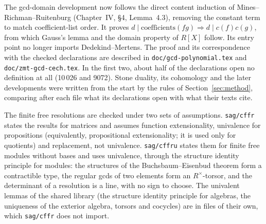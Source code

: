 \documentclass[11pt]{article}
\begin{document}
The gcd-domain development now follows the direct content induction of
Mines--Richman--Ruitenburg (Chapter~IV, \S4, Lemma~4.3), removing the
constant term to match coefficient-list order. It proves
$d\mid\text{coefficients}(fg)\Rightarrow d\mid c(f)c(g)$, from which
Gauss's lemma and the domain property of $R[X]$ follow. Its entry point
no longer imports Dedekind--Mertens. The proof and its correspondence
with the checked declarations are described in
\texttt{doc/gcd-polynomial.tex} and \texttt{doc/zmt-gcd-cech.tex}.
In the first two, about half of the declarations open no definition at
all (10\,026 and 9072). Stone duality, its cohomology and the later
developments were written from the start by the
rules of Section~\ref{sec:method}, comparing after each file what its
declarations open with what their texts cite.

The finite free resolutions are checked under two sets of assumptions.
\texttt{sag/cffr} states the results for matrices and assumes function
extensionality, univalence for propositions (equivalently, propositional
extensionality; it is used only for quotients) and replacement, not
univalence. \texttt{sag/cffru} states them for finite free modules
without bases and uses univalence, through the structure identity
principle for modules: the structures of the Buchsbaum--Eisenbud
theorem form a contractible type, the regular gcds of two elements form
an $R^\times$-torsor, and the determinant of a resolution is a line,
with no sign to choose. The univalent lemmas of the shared library (the
structure identity principle for algebras, the uniqueness of the
exterior algebra, torsors and cocycles) are in files of their own, which
\texttt{sag/cffr} does not import.
\end{document}
